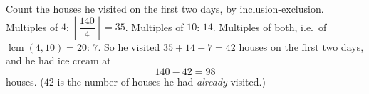 Count the houses he visited on the first two days, by inclusion-exclusion. Multiples of $4$: $\left\lfloor\dfrac{140}{4}\right\rfloor=35$. Multiples of $10$: $14$. Multiples of both, i.e.\ of $\operatorname{lcm}(4,10)=20$: $7$. So he visited $35+14-7=42$ houses on the first two days, and he had ice cream at
\[
140-42=\boxed{98}
\]
houses. ($42$ is the number of houses he had \emph{already} visited.)
